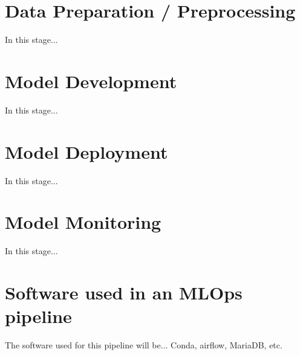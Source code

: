 \documentclass[12pt]{report}
\begin{document}
\section{Data Preparation / Preprocessing}
In this stage...

\section{Model Development}
In this stage...

\section{Model Deployment}
In this stage...

\section{Model Monitoring}
In this stage...

\section{Software used in an MLOps pipeline}\label{sec:Software}
The software used for this pipeline will be... 
Conda, airflow, MariaDB, etc.

\printbibliography
\end{document}
